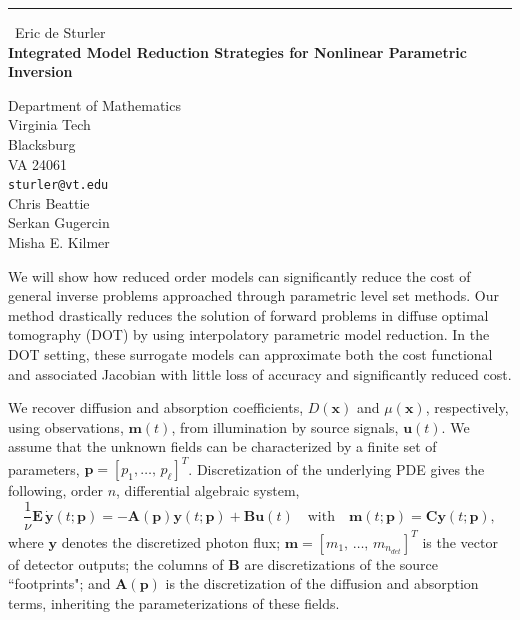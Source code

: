\documentclass{report}
\begin{document}
\begin{center}
\rule{6in}{1pt} \
{\large Eric de Sturler \\
{\bf Integrated Model Reduction Strategies for Nonlinear Parametric Inversion}}

Department of Mathematics \\ Virginia Tech \\ Blacksburg \\ VA 24061
\\
{\tt sturler@vt.edu}\\
Chris Beattie\\
Serkan Gugercin\\
Misha E. Kilmer\end{center}

We will show how reduced order models can significantly reduce the cost of general
inverse problems approached through parametric level set methods.
Our method drastically reduces the solution of forward problems in diffuse optimal
tomography (DOT) by using interpolatory parametric model reduction.
In the DOT setting, these surrogate models can approximate both the cost functional and
associated Jacobian with little loss of accuracy and significantly reduced cost.


\vspace{11pt}
We recover diffusion and absorption coefficients, $D( \mathbf{x})$ and
$\mu( \mathbf{x})$, respectively,
using observations, $\boldsymbol{m}(t)$,
from illumination by source signals, $\mathbf{u}(t)$.
We assume that the unknown fields can be characterized by
a finite set of parameters, $ \mathbf{p}=[p_1,\ldots,\,p_{\ell}]^T$.
Discretization of the underlying PDE gives the following, order $n$,
differential algebraic system,
\begin{equation} \label{processModelDynSys}
\frac{1}{\nu} \mathbf{E}\, \dot{ \mathbf{y}}(t; \mathbf{p}) =- \mathbf{A}( \mathbf{p})
\mathbf{y}(t; \mathbf{p}) + \mathbf{B} \mathbf{u}(t)\quad\mbox{with}\quad
\boldsymbol{m}(t; \mathbf{p}) = \mathbf{C} \mathbf{y}(t; \mathbf{p}) ,
\end{equation}
where $ \mathbf{y} $ denotes the discretized photon flux;
$ \boldsymbol{m}=[m_1,\,\ldots,\, m_{n_{det}}]^T$ is the vector of detector outputs;
the columns of $ \mathbf{B}$ are discretizations of the source ``footprints"; and
$\mathbf{A}( \mathbf{p})$ is the discretization of the diffusion and
absorption terms, inheriting
the parameterizations of these fields.
\end{document}
